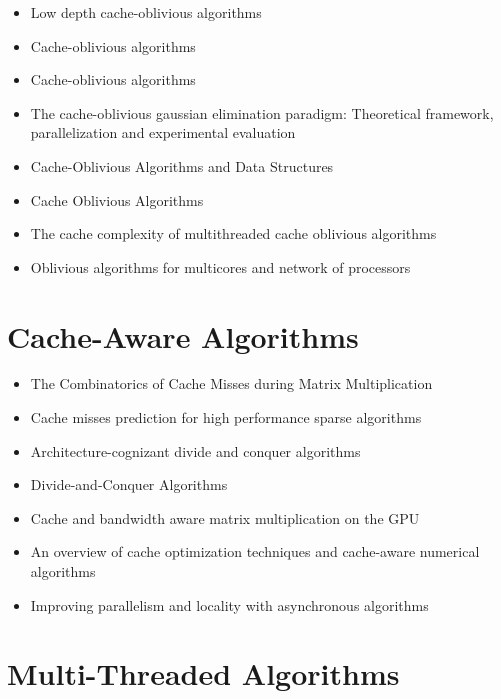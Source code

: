\begin{itemize}
\item Low depth cache-oblivious algorithms \cite{Blelloch2009}
\item Cache-oblivious algorithms \cite{Frigo1999}
\item Cache-oblivious algorithms \cite{Prokop1999}
\item The cache-oblivious gaussian elimination paradigm: Theoretical
  framework, parallelization and experimental evaluation
  \cite{Chowdhury2007}
\item Cache-Oblivious Algorithms and Data Structures
  \cite{Demaine2002}
\item Cache Oblivious Algorithms \cite{Kumar2003}
\item The cache complexity of multithreaded cache oblivious algorithms
  \cite{Frigo2009}
\item Oblivious algorithms for multicores and network of processors
  \cite{Chowdhury2009}
\end{itemize}


\section*{Cache-Aware Algorithms}
\label{sec:lr-cache-aware-algorithms}

\begin{itemize}
\item The Combinatorics of Cache Misses during Matrix Multiplication
  \cite{Chatterjee2000}
\item Cache misses prediction for high performance sparse algorithms
  \cite{Fraguela1998}
\item Architecture-cognizant divide and conquer algorithms
  \cite{Gatlin1999}
\item Divide-and-Conquer Algorithms \cite{Gurari2010}
\item Cache and bandwidth aware matrix multiplication on the GPU
  \cite{Hall2001}
\item An overview of cache optimization techniques and cache-aware
  numerical algorithms \cite{Kowarschik2003}
\item Improving parallelism and locality with asynchronous algorithms
  \cite{Liu2010}
\end{itemize}


\section*{Multi-Threaded Algorithms}
\label{sec:lr-multi-threaded-algorithms}

